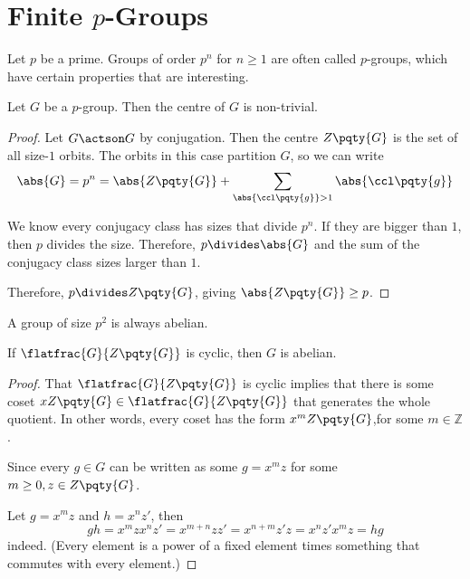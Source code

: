 \section{Finite \(p\)-Groups}

Let \(p\) be a prime. Groups of order \(p^n\) for \(n \geq 1\) are often called \(p\)-groups, which have certain properties that are interesting.

\begin{theorem}
    \label{thm:p-groups-non-trivial-centre}%
    Let \(G\) be a \(p\)-group. Then the centre of \(G\) is non-trivial.
\end{theorem}

\begin{proof}
    Let \(G \actson G\) by conjugation. Then the centre \(Z\pqty{G}\) is the set of all size-\(1\) orbits. The orbits in this case partition \(G\), so we can write
    \[
        \abs{G} = p^n = \abs{Z\pqty{G}} + \sum_{\abs{\ccl\pqty{g}} > 1} \abs{\ccl\pqty{g}}
    \]

    We know every conjugacy class has sizes that divide \(p^n\). If they are bigger than \(1\), then \(p\) divides the size. Therefore, \(p \divides \abs{G}\) and the sum of the conjugacy class sizes larger than \(1\).

    Therefore, \(p \divides Z\pqty{G}\), giving \(\abs{Z\pqty{G}} \geq p\).
\end{proof}

\begin{theorem}
    \label{thm:order-p2-abelian}%
    A group of size \(p^2\) is always abelian.
\end{theorem}

\begin{lemma}
    \label{lem:quotient-by-centre-cyclic-abelian}%
    If \(\flatfrac{G}{Z\pqty{G}}\) is cyclic, then \(G\) is abelian.
\end{lemma}

\begin{proof}
    That \(\flatfrac{G}{Z\pqty{G}}\) is cyclic implies that there is some coset \(x Z \pqty{G} \in \flatfrac{G}{Z\pqty{G}}\) that generates the whole quotient. In other words, every coset has the form \(x^m Z\pqty{G}\),for some \(m \in \mathbb{Z}\).

    Since every \(g \in G\) can be written as some \(g = x^m z\) for some \(m \geq 0, z \in Z\pqty{G}\).

    Let \(g = x^m z\) and \(h = x^n z'\), then
    \[
        g h = x^m z x^n z' = x^{m + n} z z' = x^{n + m} z' z = x^n z' x^m z = h g
    \]
    indeed. (Every element is a power of a fixed element times something that commutes with every element.)
\end{proof}

